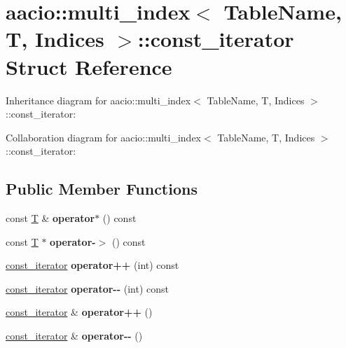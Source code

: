 \hypertarget{structaacio_1_1multi__index_1_1const__iterator}{}\section{aacio\+:\+:multi\+\_\+index$<$ Table\+Name, T, Indices $>$\+:\+:const\+\_\+iterator Struct Reference}
\label{structaacio_1_1multi__index_1_1const__iterator}


Inheritance diagram for aacio\+:\+:multi\+\_\+index$<$ Table\+Name, T, Indices $>$\+:\+:const\+\_\+iterator\+:


Collaboration diagram for aacio\+:\+:multi\+\_\+index$<$ Table\+Name, T, Indices $>$\+:\+:const\+\_\+iterator\+:
\subsection*{Public Member Functions}
\begin{DoxyCompactItemize}
\item 
\mbox{\label{structaacio_1_1multi__index_1_1const__iterator_a4b8a3e51e24123a4485cd225c1d700ff}} 
const \mbox{\hyperlink{struct_t}{T}} \& {\bfseries operator$\ast$} () const
\item 
\mbox{\label{structaacio_1_1multi__index_1_1const__iterator_a5dd50d17e1c342869965c42ef836c876}} 
const \mbox{\hyperlink{struct_t}{T}} $\ast$ {\bfseries operator-\/$>$} () const
\item 
\mbox{\label{structaacio_1_1multi__index_1_1const__iterator_a535cb25805d78d99fa62f7db5f317d88}} 
\mbox{\hyperlink{structaacio_1_1multi__index_1_1const__iterator}{const\+\_\+iterator}} {\bfseries operator++} (int) const
\item 
\mbox{\label{structaacio_1_1multi__index_1_1const__iterator_a842f30a1d7d36a406ddebf5c5d0f5853}} 
\mbox{\hyperlink{structaacio_1_1multi__index_1_1const__iterator}{const\+\_\+iterator}} {\bfseries operator-\/-\/} (int) const
\item 
\mbox{\label{structaacio_1_1multi__index_1_1const__iterator_af31a9214a15a96a934e669e42b9c0bd8}} 
\mbox{\hyperlink{structaacio_1_1multi__index_1_1const__iterator}{const\+\_\+iterator}} \& {\bfseries operator++} ()
\item 
\mbox{\label{structaacio_1_1multi__index_1_1const__iterator_aaa609db41191352830e5e9642b411177}} 
\mbox{\hyperlink{structaacio_1_1multi__index_1_1const__iterator}{const\+\_\+iterator}} \& {\bfseries operator-\/-\/} ()
\end{DoxyCompactItemize}
